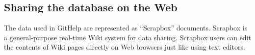 \documentclass{sigchi}
\def\GH{\textsf{GitHelp}}
\def\SB{\textsf{Scrapbox}}
\begin{document}
% 


% 


\subsection{Sharing the database on the Web}

The data used in {\GH} are represented as ``{\SB}'' documents.
%
{\SB} is a general-purpose real-time Wiki system for data sharing.
{\SB} users can edit the contents of Wiki pages directly
on Web browsers just like using text editors.
\end{document}
